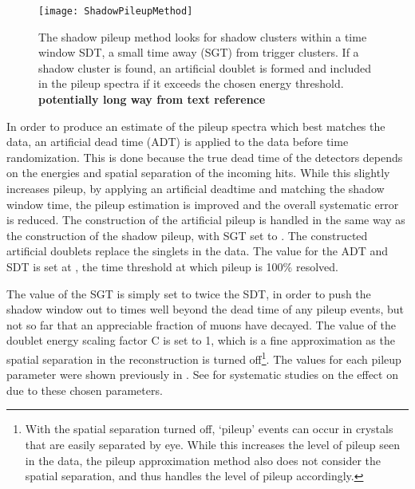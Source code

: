 \begin{figure}
    \centering
    \texttt{[image: ShadowPileupMethod]}
    \caption[Shadow pileup method]{The shadow pileup method looks for shadow clusters within a time window SDT, a small time away (SGT) from trigger clusters. If a shadow cluster is found, an artificial doublet is formed and included in the pileup spectra if it exceeds the chosen energy threshold. \textbf{potentially long way from text reference}}
    \label{fig:ShadowPileupMethod}
\end{figure}


In order to produce an estimate of the pileup spectra which best matches the data, an artificial dead time (ADT) is applied to the data before time randomization. This is done because the true dead time of the detectors depends on the energies and spatial separation of the incoming hits. While this slightly increases pileup, by applying an artificial deadtime and matching the shadow window time, the pileup estimation is improved and the overall systematic error is reduced. The construction of the artificial pileup is handled in the same way as the construction of the shadow pileup, with SGT set to . The constructed artificial doublets replace the singlets in the data. The value for the ADT and SDT is set at , the time threshold at which pileup is 100\% resolved. 

The value of the SGT is simply set to twice the SDT, in order to push the shadow window out to times well beyond the dead time of any pileup events, but not so far that an appreciable fraction of muons have decayed. The value of the doublet energy scaling factor C is set to 1, which is a fine approximation as the spatial separation in the reconstruction is turned off\footnote{With the spatial separation turned off, `pileup' events can occur in crystals that are easily separated by eye. While this increases the level of pileup seen in the data, the pileup approximation method also does not consider the spatial separation, and thus handles the level of pileup accordingly.}. The values for each pileup parameter were shown previously in . See  for systematic studies on the effect on \wa due to these chosen parameters.


